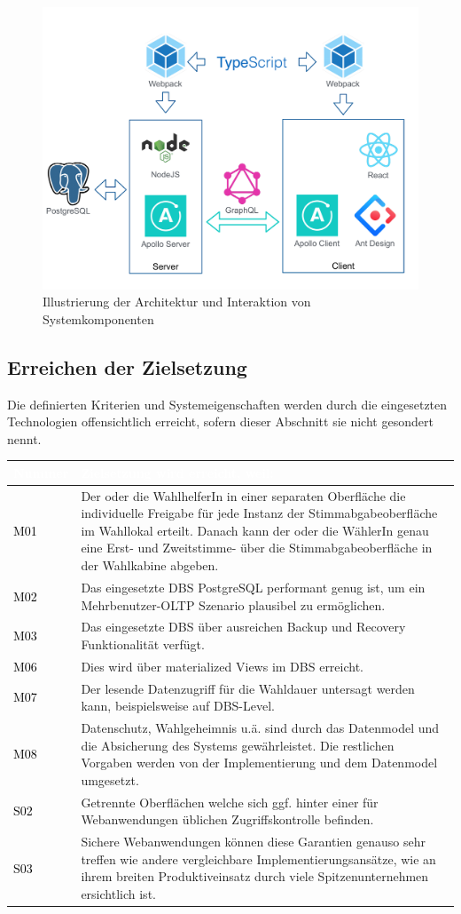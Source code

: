 \documentclass[a4paper,12pt]{article}
\newcommand\addrow[2]{\textcolor{black}{#1} &#2\\ \hline}
\newcommand\addheading[2]{\rowcolor{TUMBlue}\textcolor{white}{#1} & \textcolor{white}{#2}\\ \hline}
\newcommand\tabularhead{\begin{tabular}{|b|p{13cm}|}
\hline
}
\newenvironment{usecase}{\tabularhead}
{\hline\end{tabular}}
\begin{document}
\begin{figure}[h!]
      \centering
      \includegraphics[width=\textwidth]{architecture.pdf}
      \caption{Illustrierung der Architektur und Interaktion von Systemkomponenten}
      \label{fig:architecture}
\end{figure}

\clearpage

\subsection{Erreichen der Zielsetzung}
Die definierten Kriterien und Systemeigenschaften werden durch die eingesetzten Technologien 
offensichtlich erreicht, sofern dieser Abschnitt sie nicht gesondert nennt.

\begin{usecase}
	\addheading{Nummer}{Zielsetzung wird erreicht, weil:} 
      \addrow{M01}{Der oder die WahlhelferIn in einer separaten Oberfläche die individuelle Freigabe für jede Instanz der Stimmabgabeoberfläche im Wahllokal erteilt. Danach kann der oder die WählerIn genau eine Erst- und Zweitstimme- über die Stimmabgabeoberfläche in der Wahlkabine abgeben.}
      \addrow{M02}{Das eingesetzte DBS PostgreSQL performant genug ist, um ein Mehrbenutzer-OLTP Szenario plausibel zu ermöglichen.}
      \addrow{M03}{Das eingesetzte DBS über ausreichen Backup und Recovery Funktionalität verfügt.}
	\addrow{M06}{Dies wird über materialized Views im DBS erreicht.}
	\addrow{M07}{Der lesende Datenzugriff für die Wahldauer untersagt werden kann, beispielsweise auf DBS-Level.}
      \addrow{M08}{Datenschutz, Wahlgeheimnis u.ä. sind durch das Datenmodel und die Absicherung des Systems gewährleistet. Die restlichen Vorgaben werden von der Implementierung und dem Datenmodel umgesetzt.}
      \addrow{S02}{Getrennte Oberflächen welche sich ggf. hinter einer für Webanwendungen üblichen Zugriffskontrolle befinden.}
      \addrow{S03}{Sichere Webanwendungen können diese Garantien genauso sehr treffen wie andere vergleichbare Implementierungsansätze, wie an ihrem breiten Produktiveinsatz durch viele Spitzenunternehmen ersichtlich ist.}
\end{usecase}
\end{document}
